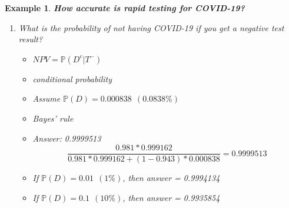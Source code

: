 \documentclass[12pt]{amsart}
\newtheorem{example}[theorem]{Example}
\begin{document}
\begin{example}  {\large \textbf{How accurate is rapid testing for COVID-19?} }
{\begin{enumerate}
\vspace{2cm}
\begin{itemize}
	\item $PPV = \mathbb{P}(D | T^+)$
	\item conditional probability
	\item Assume $\mathbb{P}(D) = 0.000838\ \  (0.0838\%)$ (Multnomah Co on 10/12/2022)
	\item Bayes' rule
	\item Answer: 0.03996265
	$$\frac{0.943*0.000838}{0.943*0.000838 + (1-0.981)*(1-0.000838)}= 0.03996265$$
	\item If $\mathbb{P}(D) = 0.01\ \  (1\%)$, then answer = 0.3339235
	\item If $\mathbb{P}(D) = 0.1\ \  (10\%)$, then answer = 0.8464991
\end{itemize}

\newpage
Given: $\mathbb{P}(T^+|D) = 0.943$, $\ \ \mathbb{P}(T^-|D^c) = 0.981$ %

\vspace{0.5cm}
\item What is the probability of not having COVID-19 if you get a negative test result?



\vspace{2cm}
\begin{itemize}
	\item $NPV = \mathbb{P}(D^c | T^-)$
	\item conditional probability
	\item Assume $\mathbb{P}(D) = 0.000838\ \  (0.0838\%)$
	\item Bayes' rule
	\item Answer: 0.9999513
	$$\frac{0.981*0.999162}{0.981*0.999162 + (1-0.943)*0.000838}= 0.9999513$$
	\item If $\mathbb{P}(D) = 0.01\ \  (1\%)$, then answer = 0.9994134
	\item If $\mathbb{P}(D) = 0.1\ \  (10\%)$, then answer = 0.9935854
\end{itemize}

\end{enumerate}
}
\end{example} 
\end{document}
